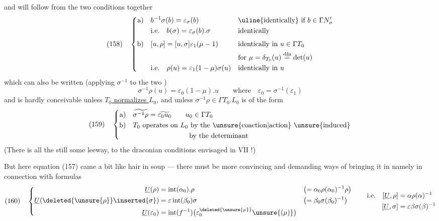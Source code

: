
and will follow from the two conditions together
\[
(158)\quad
\left\{
\begin{aligned}
\text{a)}\quad&b^{-1}\sigma(b)=\varepsilon_\sigma(b)
&&\text{\uline{identically} if }b\in\Gamma N'_\sigma\\
&\text{i.e.}\quad b(\sigma)=\varepsilon_\sigma(b).\sigma
&&\text{identically}\\[4pt]
\text{b)}\quad&[u,\rho]=[u,\sigma]\varepsilon_1(\mu-1)
&&\text{identically in }u\in\Gamma T_0\\
&&&\text{for }\mu=\delta_{T_0}(u)\overset{\mathrm{dfn}}=\det(u)\\
&\text{i.e.}\quad\rho(u)=\varepsilon_1(1-\mu)\sigma(u)
&&\text{identically in }u
\end{aligned}
\right.
\]
which can also be written (applying $\sigma^{-1}$ to the two )
\[
\sigma^{-1}\rho(u)=\varepsilon_0(1-\mu).u
\qquad\text{where}\quad\varepsilon_0=\sigma^{-1}(\varepsilon_1)
\]
and is hardly conceivable unless \uline{$T_0$ normalizes $L_0$}, and unless $\sigma^{-1}\rho\in\Gamma T_0.L_0$  is of the form
\[
(159)\quad
\left\{
\begin{aligned}
\text{a)}\quad&\widetilde{\sigma^{-1}\rho}=\widetilde{\varepsilon_0u_0}
\qquad u_0\in\Gamma T_0\\
\text{b)}\quad& T_0\text{ operates on }L_0\text{ by the \unsure{coaction|action} \unsure{induced}}\\
&\hspace{8em}\text{by the determinant}
\end{aligned}
\right.
\]
(There is all the  still some leeway,  to the draconian conditions envisaged in \uline{$\overline{\mathrm{VII}}$} !)

But here equation (157) came a bit like hair in soup --- there must be more convincing and demanding ways of bringing it in namely  in connection with formulas
\[
(160)\quad
\left\{
\begin{aligned}
\underline U(\rho)&=\operatorname{int}(\alpha_0).\rho
&&\bigl(=\alpha_0\rho(\alpha_0)^{-1}\rho\bigr)\\
\underline U(\deleted{\unsure{\rho}}\inserted{\sigma})&=
\varepsilon\operatorname{int}(\beta_0)\sigma
&&\bigl(=\beta_0\sigma(\beta_0)^{-1}\bigr)\\
\underline U(\varepsilon_0)&=\operatorname{int}(f^{-1})
\bigl(\varepsilon_0^{\deleted{\unsure{\mu}}}\unsure{(\mu)}\bigr)
\end{aligned}
\right.
\qquad
\begin{aligned}
\text{i.e.}\quad[\underline U,\rho]&=\alpha\rho(\alpha)^{-1}\\
[\underline U,\sigma]&=\varepsilon\beta\sigma(\beta)^{-1}
\end{aligned}
\]

